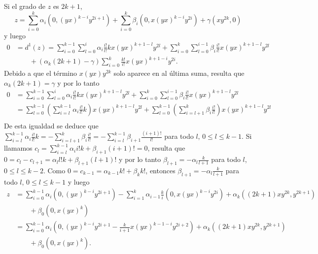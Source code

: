 \documentclass[fleqn,../tesis.tex]{subfiles}
\begin{document}
Si el grado de $z$ es $2k + 1$,
\[
    z = \sum_{i = 0}^{k}\alpha_i \left(0, (yx)^{k - i}y^{2i + 1}\right) + \sum_{i = 0}^{k}\beta_i \left(0, x(yx)^{k - i}y^{2i}\right)
        +\gamma\left(xy^{2k}, 0\right)
\]
y luego
\begin{align*}
    0 &= d^{1}(z) = \sum_{i = 0}^{k - 1}\sum_{l = 0}^{i}\alpha_i \frac{i!}{l!}kx(yx)^{k + 1 - l}y^{2l}
        + \sum_{i = 0}^{k}\sum_{l = 0}^{i - 1}\beta_i\frac{i!}{l!}x(yx)^{k + 1 - l}y^{2l}\\
        &\qquad + \left(\alpha_k (2k + 1) - \gamma\right)\sum_{i = 0}^{k}\frac{k!}{i!}x(yx)^{k + 1- i}y^{2i}.
\end{align*}
Debido a que el término $x(yx)y^{2k}$ solo aparece en al última suma, resulta que $\alpha_k (2k + 1) = \gamma$ y por lo tanto
\begin{align*}
    0 &= \sum_{i = 0}^{k - 1}\sum_{l = 0}^{i}\alpha_i \frac{i!}{l!}kx(yx)^{k + 1 - l}y^{2l}
        + \sum_{i = 0}^{k}\sum_{l = 0}^{i - 1}\beta_i\frac{i!}{l!}x(yx)^{k + 1 - l}y^{2l}\\
    &=   \sum_{l = 0}^{k - 1}\left(\sum_{i = l}^{k - 1}\alpha_i \frac{i!}{l!}k\right)x(yx)^{k + 1 - l}y^{2l}
        + \sum_{l = 0}^{k - 1}\left(\sum_{i = l + 1}^{k}\beta_i\frac{i!}{l!}\right)x(yx)^{k + 1 - l}y^{2l}\\
\end{align*}
De esta igualdad se deduce que
$\sum_{i = l}^{k - 1}\alpha_i \frac{i!}{l!}k = -\sum_{i = l + 1}^{k}\beta_i\frac{i!}{l!} = -\sum_{i = l}^{k - 1}\beta_{i + 1}\frac{(i + 1)!}{l!}$
para todo $l$, $0\leq l \leq k - 1$. Si llamamos $c_l = \sum_{i = l}^{k - 1}\alpha_i i!k + \beta_{i + 1}(i + 1)! = 0$, resulta que
$0 = c_l - c_{l + 1} = \alpha_l l!k + \beta_{l + 1}(l + 1)!$ y por lo tanto $\beta_{l + 1} = -\alpha_l \frac{k}{l + 1}$ para todo $l$,
$0 \leq l \leq k - 2$. Como  $0 = c_{k - 1} = \alpha_{k - 1}k! + \beta_k k!$, entonces $\beta_{l + 1} = -\alpha_l \frac{k}{l + 1}$ para todo $l$,
$0 \leq l \leq k - 1$ y luego
\begin{align*}
    z &= \sum_{i = 0}^{k - 1}\alpha_i \left(0, (yx)^{k - i}y^{2i + 1}\right) - \sum_{i = 1}^{k} \alpha_{i - 1} \frac{k}{i}\left(0, x(yx)^{k - i}y^{2i}\right)
        + \alpha_k\left((2k + 1)xy^{2k}, y^{2k + 1}\right)\\
    &\qquad + \beta_0 \left(0, x(yx)^{k}\right)\\
    &= \sum_{i = 0}^{k - 1}\alpha_i \left(0, (yx)^{k - i}y^{2i + 1} - \frac{k}{i + 1}x(yx)^{k - 1 - i}y^{2i + 2}\right)
        + \alpha_k\left((2k + 1)xy^{2k}, y^{2k + 1}\right)\\
    &\qquad + \beta_0 \left(0, x(yx)^{k}\right).
\end{align*}
\end{document}

